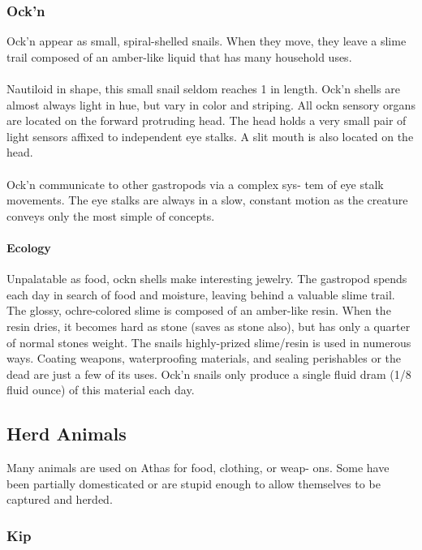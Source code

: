 \subsubsection{Ock'n}

Ock'n appear as small, spiral-shelled snails. When they move,
they leave a slime trail composed of an amber-like liquid that
has many household uses.\\
\\
Nautiloid in shape, this small snail seldom reaches 1 in
length. Ock'n shells are almost always light in hue, but vary in
color and striping. All ockn sensory organs are located on the
forward protruding head. The head holds a very small pair of
light sensors affixed to independent eye stalks. A slit mouth is
also located on the head.\\
\\
Ock'n communicate to other gastropods via a complex sys-
tem of eye stalk movements. The eye stalks are always in a
slow, constant motion as the creature conveys only the most
simple of concepts.

\paragraph{Ecology}
Unpalatable as food, ockn shells make interesting jewelry.
The gastropod spends each day in search of food and moisture,
leaving behind a valuable slime trail. The glossy,
ochre-colored slime is composed of an amber-like resin. When
the resin dries, it becomes hard as stone (saves as stone also),
but has only a quarter of normal stones weight. The snails
highly-prized slime/resin is used in numerous ways. Coating
weapons, waterproofing materials, and sealing perishables or
the dead are just a few of its uses. Ock'n snails only produce a
single fluid dram (1/8 fluid ounce) of this material each day.

\subsection{Herd Animals}
Many animals are used on Athas for food, clothing, or weap-
ons. Some have been partially domesticated or are stupid
enough to allow themselves to be captured and herded.

\subsubsection{Kip}

